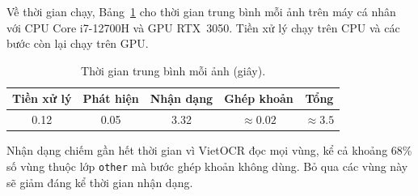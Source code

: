Về thời gian chạy, Bảng~\ref{tab:runtime} cho thời gian trung bình mỗi ảnh trên máy cá nhân với CPU Core i7-12700H và GPU RTX~3050.
Tiền xử lý chạy trên CPU và các bước còn lại chạy trên GPU.

\begin{table}[H]
\centering
\caption{Thời gian trung bình mỗi ảnh (giây).}\label{tab:runtime}
\small
\begin{tabular}{ccccc}
\toprule
\textbf{Tiền xử lý} & \textbf{Phát hiện} & \textbf{Nhận dạng} & \textbf{Ghép khoản} & \textbf{Tổng} \\
\midrule
\num{0.12} & \num{0.05} & \num{3.32} & $\approx\num{0.02}$ & $\approx\num{3.5}$ \\
\bottomrule
\end{tabular}
\end{table}

Nhận dạng chiếm gần hết thời gian vì VietOCR đọc mọi vùng, kể cả khoảng 68\% số vùng thuộc lớp \texttt{other} mà bước ghép khoản không dùng.
Bỏ qua các vùng này sẽ giảm đáng kể thời gian nhận dạng.
